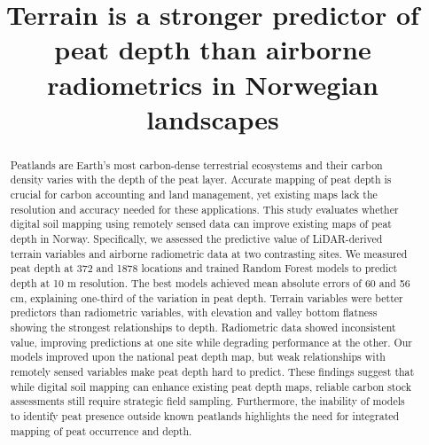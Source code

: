 \documentclass[soil, manuscript]{copernicus}
\begin{document}
\title{Terrain is a stronger predictor of peat depth than airborne radiometrics in Norwegian landscapes}











\received{}
\pubdiscuss{} %
\revised{}
\accepted{}
\published{}




\maketitle


\begin{abstract}
Peatlands are Earth's most carbon-dense terrestrial ecosystems and their carbon density varies with the depth of the peat layer.
Accurate mapping of peat depth is crucial for carbon accounting and land management, yet existing maps lack the resolution and accuracy needed for these applications.
This study evaluates whether digital soil mapping using remotely sensed data can improve existing maps of peat depth in Norway.
Specifically, we assessed the predictive value of LiDAR-derived terrain variables and airborne radiometric data at two contrasting sites.
We measured peat depth at 372 and 1878 locations and trained Random Forest models to predict depth at 10 m resolution.
The best models achieved mean absolute errors of 60 and 56 cm, explaining one-third of the variation in peat depth.
Terrain variables were better predictors than radiometric variables, with elevation and valley bottom flatness showing the strongest relationships to depth.
Radiometric data showed inconsistent value, improving predictions at one site while degrading performance at the other.
Our models improved upon the national peat depth map, but weak relationships with remotely sensed variables make peat depth hard to predict.
These findings suggest that while digital soil mapping can enhance existing peat depth maps, reliable carbon stock assessments still require strategic field sampling.
Furthermore, the inability of models to identify peat presence outside known peatlands highlights the need for integrated mapping of peat occurrence and depth.
\end{abstract}
\end{document}
